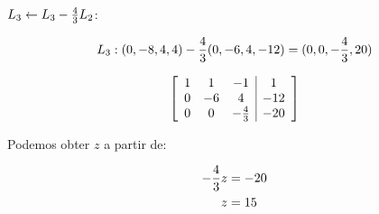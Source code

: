 \newpage

\begin{solutionbox}
  $L_{3} \leftarrow L_{3} - \frac{4}{3} L_{2}$:

  \[
  L_{3} : (0,-8,4,4) - \frac{4}{3} (0,-6,4,-12)
  = (0,0,-\frac{4}{3},20)
  \]

  \[
  \left[
  \begin{array}{ccc|c}
  1 & 1 & -1 & 1 \\
  0 & -6 & 4 & -12 \\
  0 & 0 & -\frac{4}{3} & -20
  \end{array}
  \right]
  \]

  Podemos obter $z$ a partir de:

  \[
  \begin{aligned}
  -\frac{4}{3} z &= -20 \\
  z &= 15
  \end{aligned}
  \]
\end{solutionbox}

